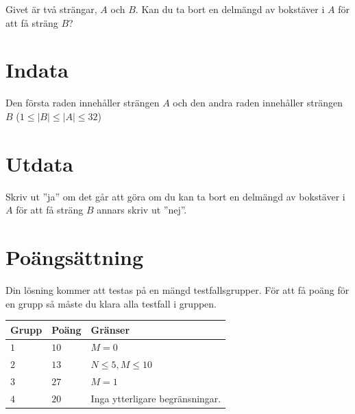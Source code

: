 
\noindent

Givet är två strängar, $A$ och $B$. Kan du ta bort en delmängd av bokstäver i $A$ för att få sträng $B$?

\section*{Indata}
Den första raden innehåller strängen $A$ och den andra raden innehåller strängen $B$ ($1 \le |B| \le |A| \le 32$)

\section*{Utdata}
Skriv ut ”ja” om det går att göra om du kan ta bort en delmängd av bokstäver i $A$ för att få sträng $B$ annars skriv ut ”nej”.

\section*{Poängsättning}
Din lösning kommer att testas på en mängd testfallsgrupper.
För att få poäng för en grupp så måste du klara alla testfall i gruppen.

\noindent
\begin{tabular}{| l | l | p{12cm} |}
  \hline
  \textbf{Grupp} & \textbf{Poäng} & \textbf{Gränser} \\ \hline
  $1$    & $10$       & $M = 0$ \\ \hline
  $2$    & $13$       & $N \leq 5, M \leq 10$ \\ \hline
  $3$    & $27$       & $M = 1$ \\ \hline
  $4$    & $20$       & Inga ytterligare begränsningar. \\ \hline
\end{tabular}

